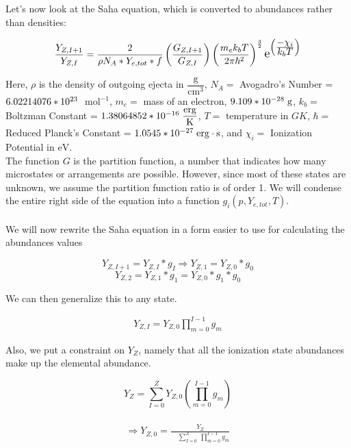 \documentclass[11pt,a4paper]{article}
\begin{document}
Let's now look at the Saha equation, which is converted to abundances rather than densities: 

\begin{align}
\frac{Y_{Z,I+1}}{Y_{Z,I}}  = \frac{2}{\rho N_A * Y_{e,tot}*f}  \left(\frac{G_{Z,I+1}}{G_{Z,I}}\right) \left(\frac{m_e k_b T}{2\pi\hbar^2}\right)^\frac{3}{2} \scalebox{1.3} e^{\left(\frac{\displaystyle -\chi_i}{\displaystyle k_b T}\right)}  
\end{align}

Here, $\rho $ is the density of outgoing ejecta in $\mathrm{\dfrac{g}{cm^3}}$, $N_A = $ Avogadro's Number = $6.02214076*10^{23} \hspace{.1 cm} $ $\mathrm{mol^{-1}}$,  $m_e = $ mass of an electron, $9.109 * 10^{-28} \hspace{.1 cm} \mathrm{g} $, $k_b = $ Boltzman Constant = $1.38064852 * 10^{-16} \hspace{.1 cm} \mathrm{\dfrac{erg}{K}}$, $T = $ temperature in $GK$, $\hbar = $ Reduced Planck's Constant = $1.0545 * 10^{-27} \hspace{.1cm} \mathrm{erg \cdot s}$, and $\chi_i = $ Ionization Potential in $\mathrm{eV}$.\\
 
The function $G$ is the partition function, a number that indicates how many microstates or arrangements are possible. However, since most of these states are unknown, we assume the partition function ratio is of order 1. We will condense the entire right side of the equation into a function $g_i (p,Y_{e,tot},T) $.
\\\\
We will now rewrite the Saha equation in a form easier to use for calculating the abundances values

$$ Y_{Z,I+1} = Y_{Z,I} * g_I \Longrightarrow  Y_{Z,1} = Y_{Z,0}*g_0 $$   $$ Y_{Z,2} = Y_{Z,1}*g_1 = Y_{Z,0}*g_1 * g_0 $$

We can then generalize this to any state. 

\begin{align} 
Y_{Z,I} = Y_{Z,0} \prod_{m=0}^{I - 1} g_m 
\end{align}

Also, we put a constraint on $Y_Z$, namely that all the ionization state abundances make up the elemental abundance.  

$$ Y_Z = \sum_{I=0}^{Z} Y_{Z,0} \left(\prod_{m=0}^{I - 1} g_m\right) $$\\
\begin{align} 
\Longrightarrow Y_{Z,0} = \frac{Y_Z}{\quad \displaystyle \sum_{I=0}^{Z} \medspace \prod_{m=0}^{I - 1} g_m}
\end{align}
\end{document}

